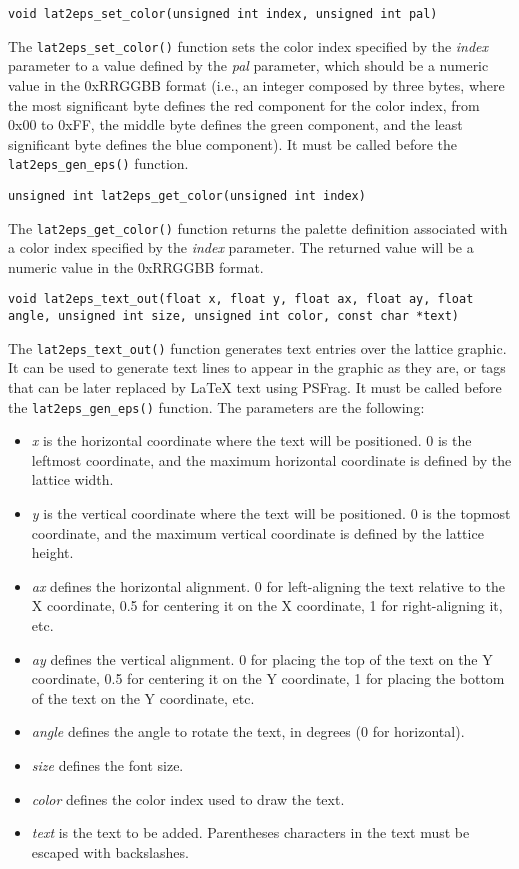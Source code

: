 \documentclass[a4paper]{article}
\begin{document}
\texttt{void lat2eps\_set\_color(unsigned int index, unsigned int pal)}
\bigbreak

The \texttt{lat2eps\_set\_color()} function sets the color index specified by the \textit{index} parameter to a value defined by the \textit{pal} parameter, which should be a numeric value in the 0xRRGGBB format (i.e., an integer composed by three bytes, where the most significant byte defines the red component for the color index, from 0x00 to 0xFF, the middle byte defines the green component, and the least significant byte defines the blue component). It must be called before the \texttt{lat2eps\_gen\_eps()} function.
\bigbreak\bigbreak


\texttt{unsigned int lat2eps\_get\_color(unsigned int index)}
\bigbreak

The \texttt{lat2eps\_get\_color()} function returns the palette definition associated with a color index specified by the \textit{index} parameter. The returned value will be a numeric value in the 0xRRGGBB format.
\bigbreak\bigbreak


\texttt{void lat2eps\_text\_out(float x, float y, float ax, float ay, float angle, unsigned int size, unsigned int color, const char *text)}
\bigbreak

The \texttt{lat2eps\_text\_out()} function generates text entries over the lattice graphic. It can be used to generate text lines to appear in the graphic as they are, or tags that can be later replaced by LaTeX text using PSFrag. It must be called before the \texttt{lat2eps\_gen\_eps()} function. The parameters are the following:

\begin{itemize}
  \item \textit{x} is the horizontal coordinate where the text will be positioned. 0 is the leftmost coordinate, and the maximum horizontal coordinate is defined by the lattice width.
  \item \textit{y} is the vertical coordinate where the text will be positioned. 0 is the topmost coordinate, and the maximum vertical coordinate is defined by the lattice height.
  \item \textit{ax} defines the horizontal alignment. 0 for left-aligning the text relative to the X coordinate, 0.5 for centering it on the X coordinate, 1 for right-aligning it, etc.
  \item \textit{ay} defines the vertical alignment. 0 for placing the top of the text on the Y coordinate, 0.5 for centering it on the Y coordinate, 1 for placing the bottom of the text on the Y coordinate, etc.
  \item \textit{angle} defines the angle to rotate the text, in degrees (0 for horizontal).
  \item \textit{size} defines the font size.
  \item \textit{color} defines the color index used to draw the text.
  \item \textit{text} is the text to be added. Parentheses characters in the text must be escaped with backslashes.
\end{itemize} 
\bigbreak\bigbreak
\end{document}
